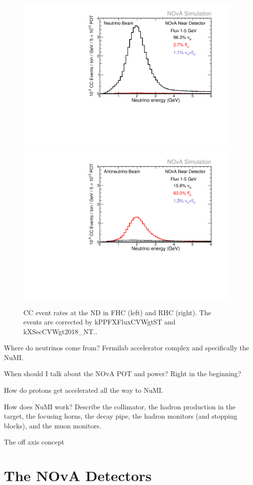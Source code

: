 \begin{figure}[!htb]  
  \centering
  \includegraphics*[width=.495\textwidth]{Plots/NOvAExperiment/NuMIBeamComponentsCCEvtsFHC.pdf}
  \noindent\centering
  \includegraphics*[width=.495\textwidth]{Plots/NOvAExperiment/NuMIBeamComponentsCCEvtsRHC.pdf}
  \caption[Beam components as CC event rates]{CC event rates at the ND in FHC (left) and RHC (right). The events are corrected by kPPFXFluxCVWgtST and kXSecCVWgt2018\_NT..}
 \label{fig:NOvABeamComponents}
\end{figure}


Where do neutrinos come from? Fermilab accelerator complex and specifically the NuMI.

When should I talk about the NOvA POT and power? Right in the beginning?

How do protons get accelerated all the way to NuMI.

How does NuMI work? Describe the collimator, the hadron production in the target, the focusing horns, the decay pipe, the hadron monitors (and stopping blocks), and the muon monitors.

The off axis concept


\section{The NOvA Detectors}\label{sec:NOvADetectors}

